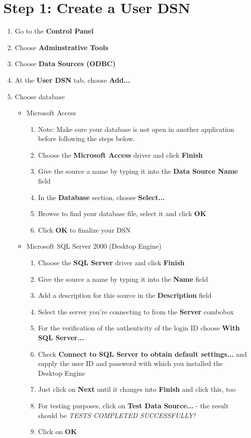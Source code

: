 \section*{Step 1: Create a User DSN}
\begin{enumerate}
	\item Go to the \textbf{Control Panel}
	\item Choose \textbf{Adminstrative Tools}
	\item Choose \textbf{Data Sources (ODBC)}
	\item At the \textbf{User DSN} tab, choose \textbf{Add...}
	\item Choose database
	\begin{itemize}
		\item Microsoft Access
		\begin{enumerate}
			\item Note: Make sure your database is not open in another application before following the steps below.
			\item Choose the \textbf{Microsoft Access} driver and click \textbf{Finish}
			\item Give the source a name by typing it into the \textbf{Data Source Name} field
			\item In the \textbf{Database} section, choose \textbf{Select...}
			\item Browse to find your database file, select it and click \textbf{OK}
			\item Click \textbf{OK} to finalize your DSN
		\end{enumerate}

		\item Microsoft SQL Server 2000 (Desktop Engine)
		\begin{enumerate}
			\item Choose the \textbf{SQL Server} driver and click \textbf{Finish}
			\item Give the source a name by typing it into the \textbf{Name} field
			\item Add a description for this source in the \textbf{Description} field
			\item Select the server you're connecting to from the \textbf{Server} combobox
			\item For the verification of the authenticity of the login ID choose \textbf{With SQL Server...}
			\item Check \textbf{Connect to SQL Server to obtain default settings...} and supply the user ID and password with which you installed the Desktop Engine
			\item Just click on \textbf{Next} until it changes into \textbf{Finish} and click this, too
			\item For testing purposes, click on \textbf{Test Data Source...} - the result should be \textit{TESTS COMPLETED SUCCESSFULLY!}
			\item Click on \textbf{OK}
		\end{enumerate}


\end{itemize}
\end{enumerate}
